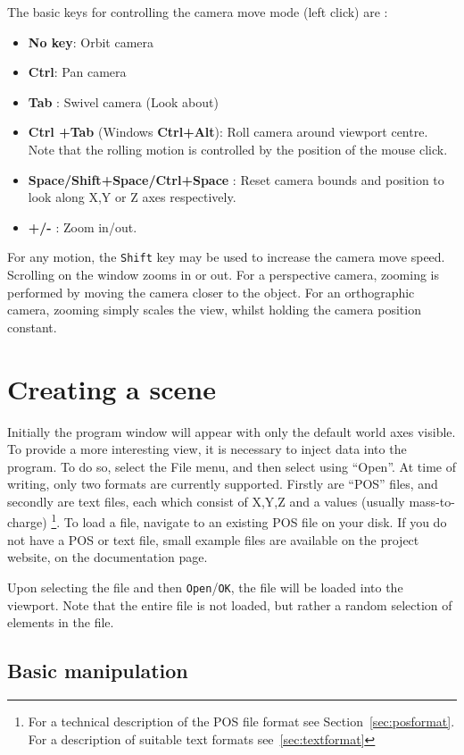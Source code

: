 \documentclass[10pt]{article}
\begin{document}
The basic keys for controlling the camera move mode (left click) are :  
\begin{itemize}
\item  \textbf{No key}: Orbit camera 
\item \textbf{Ctrl}: Pan camera 
\item  \textbf{Tab} : Swivel camera (Look about)
\item  \textbf{Ctrl +Tab} (Windows \textbf{Ctrl+Alt}): Roll camera around viewport centre. Note that the rolling motion is controlled by the position of the mouse click.
\item \textbf{Space/Shift+Space/Ctrl+Space} : Reset camera bounds and position to look along X,Y or Z axes respectively.
\item \textbf{+/-} : Zoom in/out.

\end{itemize}
For any motion, the \texttt{Shift} key may be used to increase the camera move speed.  Scrolling on the window zooms in or out. For a perspective camera, zooming is performed by moving the camera closer to the object. For an orthographic camera, zooming simply scales the view, whilst holding the camera position constant.

\section{Creating a scene}
Initially the program window will appear with only the default world axes visible. To provide a more interesting view, it is necessary to inject data into the program.  To do so, select the File menu, and then select using ``Open''. At time of writing, only two formats are currently supported. Firstly are ``POS'' files, and secondly are text files, each which consist of X,Y,Z and a values (usually mass-to-charge) \footnote{For a technical description of the POS file format see Section~\ref{sec:posformat}. For a description of suitable text formats see~\ref{sec:textformat}}. To load a file, navigate to an existing POS file on your disk. If you do not have a POS or text file, small example files are available on the project website, on the documentation page.  

Upon selecting the file and then \texttt{Open}/\texttt{OK}, the file will be loaded into the viewport. Note that the entire file is not loaded, but rather a random selection of elements in the file. 

\subsection{Basic manipulation}
\end{document}
